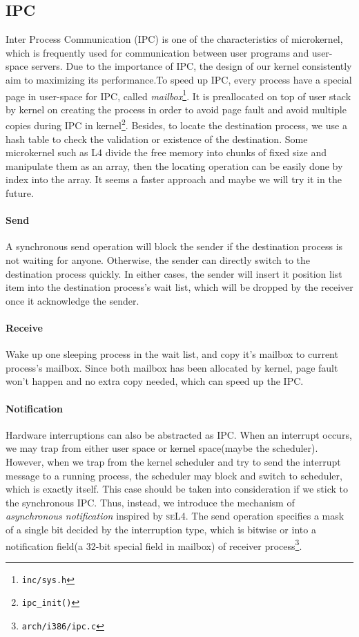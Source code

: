 \documentclass[11pt,a4paper]{article}
\begin{document}
\subsection{IPC}
Inter Process Communication (IPC) is one of the characteristics of microkernel, which is frequently used for communication between user programs and user-space servers. Due to the importance of IPC, the design of our kernel consistently aim to maximizing its performance.To speed up IPC, every process have a special page in user-space for IPC, called \emph{mailbox}\footnote{\texttt{inc/sys.h}}. It is preallocated on top of user stack by kernel on creating the process in order to avoid page fault and avoid multiple copies during IPC in kernel\footnote{\texttt{ipc\_init()}}. Besides, to locate the destination process, we use a hash table to check the validation or existence of the destination. Some microkernel such as \textsc{L4} divide the free memory into chunks of fixed size and manipulate them as an array, then the locating operation can be easily done by index into the array. It seems a faster approach and maybe we will try it in the future.

\paragraph{Send}
A synchronous send operation will block the sender if the destination process is not waiting for anyone. Otherwise, the sender can directly switch to the destination process quickly. In either cases, the sender will insert it position list item into the destination process's wait list, which will be dropped by the receiver once it acknowledge the sender.

\paragraph{Receive}
Wake up one sleeping process in the wait list, and copy it's mailbox to current process's mailbox. Since both mailbox has been allocated by kernel, page fault won't happen and no extra copy needed, which can speed up the IPC.

\paragraph{Notification}
Hardware interruptions can also be abstracted as IPC. When an interrupt occurs, we may trap from either user space or kernel space(maybe the scheduler). However, when we trap from the kernel scheduler and try to send the interrupt message to a running process, the scheduler may block and switch to scheduler, which is exactly itself. This case should be taken into consideration if we stick to the synchronous IPC. Thus, instead, we introduce the mechanism of  \emph{asynchronous notification} inspired by \textsc{seL4}\citep{sel4}. The send operation specifies a mask of a single bit decided by the interruption type, which is bitwise or into a notification field(a 32-bit special field in mailbox) of receiver process\footnote{\texttt{arch/i386/ipc.c}}.
\end{document}
